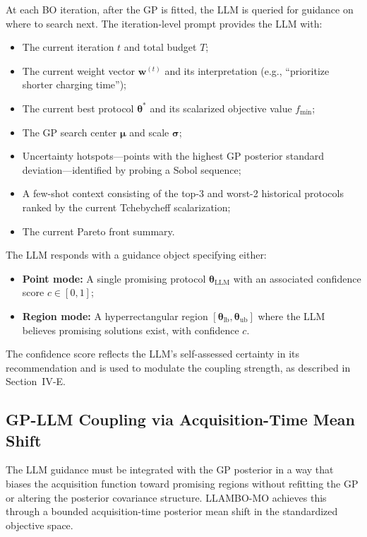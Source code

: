 \documentclass[lettersize,journal]{IEEEtran}
\begin{document}
At each BO iteration, after the GP is fitted, the LLM is queried for guidance on where to search next. The iteration-level prompt provides the LLM with:
\begin{itemize}
\item The current iteration $t$ and total budget $T$;
\item The current weight vector $\boldsymbol{w}^{(t)}$ and its interpretation (e.g., ``prioritize shorter charging time'');
\item The current best protocol $\boldsymbol{\theta}^*$ and its scalarized objective value $f_{\min}$;
\item The GP search center $\boldsymbol{\mu}$ and scale $\boldsymbol{\sigma}$;
\item Uncertainty hotspots---points with the highest GP posterior standard deviation---identified by probing a Sobol sequence;
\item A few-shot context consisting of the top-3 and worst-2 historical protocols ranked by the current Tchebycheff scalarization;
\item The current Pareto front summary.
\end{itemize}

The LLM responds with a guidance object specifying either:
\begin{itemize}
\item \textbf{Point mode:} A single promising protocol $\boldsymbol{\theta}_{\text{LLM}}$ with an associated confidence score $c \in [0, 1]$;
\item \textbf{Region mode:} A hyperrectangular region $[\boldsymbol{\theta}_{\text{lb}}, \boldsymbol{\theta}_{\text{ub}}]$ where the LLM believes promising solutions exist, with confidence $c$.
\end{itemize}

The confidence score reflects the LLM's self-assessed certainty in its recommendation and is used to modulate the coupling strength, as described in Section~IV-E.

\subsection{GP-LLM Coupling via Acquisition-Time Mean Shift}

The LLM guidance must be integrated with the GP posterior in a way that biases the acquisition function toward promising regions without refitting the GP or altering the posterior covariance structure. LLAMBO-MO achieves this through a bounded acquisition-time posterior mean shift in the standardized objective space.
\end{document}
